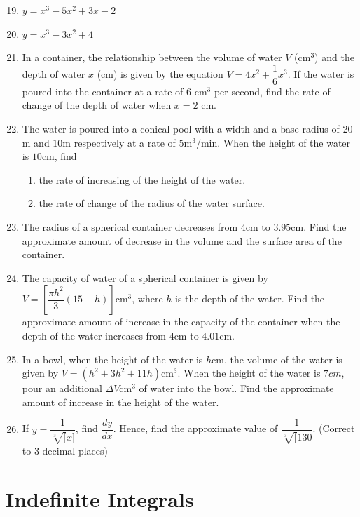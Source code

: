 \documentclass{report}
\begin{document}
\begin{enumerate}
    \setcounter{enumi}{18}
    \item $y = x^3 - 5x^2 + 3x - 2$
    \item $y = x^3 - 3x^2 + 4$
    \item In a container, the relationship between the volume of water $V$ (cm$^3$) and
          the depth of water $x$ (cm) is given by the equation $V = 4x^2 +
              \dfrac{1}{6}x^3$. If the water is poured into the container at a rate of $6$
          cm$^3$ per second, find the rate of change of the depth of water when $x=2$ cm.
    \item The water is poured into a conical pool with a width and a base radius of $20$m
          and $10$m respectively at a rate of $5$m$^3$/min. When the height of the water
          is $10$cm, find
          \begin{enumerate}
              \item the rate of increasing of the height of the water.
              \item the rate of change of the radius of the water surface.
          \end{enumerate}
    \item The radius of a spherical container decreases from $4$cm to $3.95$cm. Find the
          approximate amount of decrease in the volume and the surface area of the
          container.
    \item The capacity of water of a spherical container is given by $V =
              \left[\dfrac{\pi h^2}{3}(15-h)\right]$cm$^3$, where $h$ is the depth of the
          water. Find the approximate amount of increase in the capacity of the container
          when the depth of the water increases from $4$cm to $4.01$cm.
    \item In a bowl, when the height of the water is $h$cm, the volume of the water is
          given by $V = \left(h^2 + 3h^2 + 11h\right)$cm$^3$. When the height of the
          water is $7cm$, pour an additional $\Delta V$cm$^3$ of water into the bowl.
          Find the approximate amount of increase in the height of the water.
    \item If $y = \dfrac{1}{\sqrt[3][x]}$, find $\dfrac{dy}{dx}$. Hence, find the
          approximate value of $\dfrac{1} {\sqrt[3][{130}}$. (Correct to 3 decimal
          places)
\end{enumerate}

\chapter{Indefinite Integrals}
\end{document}
